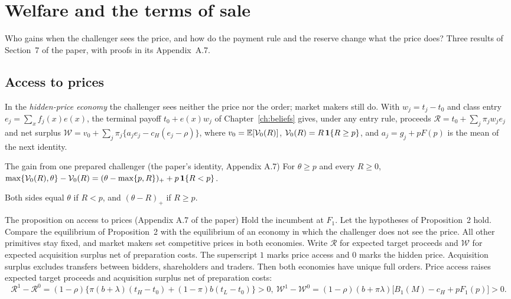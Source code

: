 \chapter{Welfare and the terms of sale}\label{ch:welfare}

\begin{chapterplan}
Who gains when the challenger sees the price, and how do the payment rule and the reserve change what the price
does? Three results of Section~7 of the paper, with proofs in its Appendix~A.7.
\end{chapterplan}

\section{Access to prices}\label{sec:welfare-access}

In the \emph{hidden-price economy} the challenger sees neither the price nor the order; market makers still do. With
\(w_j=t_j-t_0\) and class entry \(e_j=\sum_xf_j(x)e(x)\), the terminal payoff \(t_0+e(x)w_j\) of
Chapter~\ref{ch:beliefs} gives, under any entry rule, proceeds \(\mathcal R=t_0+\sum_j\pi_jw_je_j\) and net surplus
\(\mathcal W=v_0+\sum_j\pi_j\{a_je_j-c_H(e_j-\rho)\}\), where \(v_0=\mathbb{E}[\mathcal V_0(R)]\),
\(\mathcal V_0(R)=R\,\mathbf{1}\{R\ge p\}\), and \(a_j=g_j+pF(p)\) is the mean of the next identity.

{\small
\begin{paperresult}{The gain from one prepared challenger (the paper's identity, Appendix A.7)}
For \(\theta\ge p\) and every \(R\ge0\),
\(\max\{\mathcal V_0(R),\theta\}-\mathcal V_0(R)=(\theta-\max\{p,R\})_++p\,\mathbf{1}\{R<p\}\).
\end{paperresult}}
\noindent Both sides equal \(\theta\) if \(R<p\), and \((\theta-R)_+\) if \(R\ge p\).

{\small
\begin{paperresult}{The proposition on access to prices (Appendix A.7 of the paper)}
Hold the incumbent at \(F_1\). Let the hypotheses of Proposition~2 hold. Compare the equilibrium of Proposition~2 with
the equilibrium of an economy in which the challenger does not see the price. All other primitives stay fixed, and
market makers set competitive prices in both economies. Write \(\mathcal R\) for expected target proceeds and
\(\mathcal W\) for expected acquisition surplus net of preparation costs. The superscript \(1\) marks price access
and \(0\) marks the hidden price. Acquisition surplus excludes transfers between bidders, shareholders and traders.
Then both economies have unique full orders. Price access raises expected target proceeds and acquisition surplus net
of preparation costs:
\[
\mathcal R^1-\mathcal R^0=(1-\rho)\bigl\{\pi(b+\lambda)(t_H-t_0)+(1-\pi)b(t_L-t_0)\bigr\}>0,\ 
\mathcal W^1-\mathcal W^0=(1-\rho)(b+\pi\lambda)\bigl[B_1(M)-c_H+pF_1(p)\bigr]>0.
\]
\end{paperresult}}

